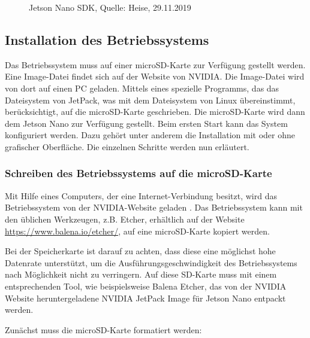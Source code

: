 \medskip

\begin{figure}
	
	
	\caption{Jetson Nano SDK,  Quelle: Heise, 29.11.2019} \label{JetsonSDK}
\end{figure}


\subsection{Installation des Betriebssystems}



Das Betriebssystem muss auf einer microSD-Karte zur Verfügung gestellt werden. Eine Image-Datei findet sich auf der Website von NVIDIA. Die Image-Datei wird von dort auf einen PC geladen. Mittels eines spezielle Programms, das das Dateisystem von JetPack, was mit dem Dateisystem von Linux übereinstimmt, berücksichtigt, auf die microSD-Karte geschrieben. Die microSD-Karte wird dann dem Jetson Nano zur Verfügung gestellt. Beim ersten Start kann das System konfiguriert werden. Dazu gehört unter anderem die Installation mit oder ohne grafischer Oberfläche. Die einzelnen Schritte werden nun erläutert.




\subsubsection{Schreiben des Betriebssystems auf die microSD-Karte}

Mit Hilfe eines Computers, der eine Internet-Verbindung besitzt, wird das Betriebssystem von der NVIDIA-Website geladen \cite{JetsonUserManual:2020, JetPackOS:2021}. Das Betriebssystem kann mit den üblichen Werkzeugen, z.B. Etcher, erhältlich auf der Website \textcolor{blue}{\url{https://www.balena.io/etcher/}}, auf eine microSD-Karte kopiert werden. \cite{JetsonGettingStarted:2019} 

Bei der Speicherkarte ist darauf zu achten, dass diese eine möglichst hohe Datenrate unterstützt, um die Ausführungsgeschwindigkeit des Betriebssystems nach Möglichkeit nicht zu verringern. Auf diese SD-Karte muss mit einem entsprechenden Tool, wie beispielsweise Balena Etcher, das von der NVIDIA Website heruntergeladene NVIDIA JetPack Image für Jetson Nano entpackt werden. 


Zunächst muss die microSD-Karte formatiert werden:



